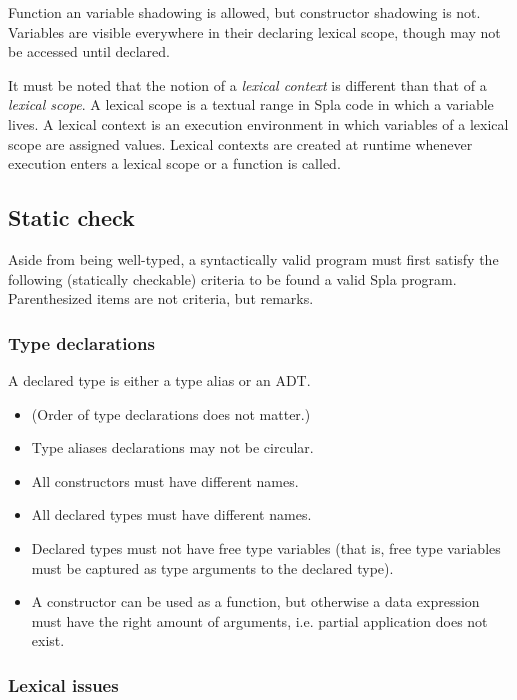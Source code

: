 \documentclass[english,10pt]{article} %
\theoremstyle{definitionstyle}
\theoremstyle{lemmastyle}
\begin{document}
Function an variable shadowing is allowed, but constructor shadowing is not. Variables are visible everywhere in their declaring lexical scope, though may not be accessed until declared.

It must be noted that the notion of a \emph{lexical context} is different than that of a \emph{lexical scope}. A lexical scope is a textual range in Spla code in which a variable lives. A lexical context is an execution environment in which variables of a lexical scope are assigned values. Lexical contexts are created at runtime whenever execution enters a lexical scope or a function is called.


\subsection{Static check}
\label{staticcheck}

Aside from being well-typed, a syntactically valid program must first satisfy the following (statically checkable) criteria to be found a valid Spla program. Parenthesized items are not criteria, but remarks.


\subsubsection*{Type declarations}

A declared type is either a type alias or an ADT.

\begin{itemize}
\item (Order of type declarations does not matter.)
\item Type aliases declarations may not be circular.
\item All constructors must have different names.
\item All declared types must have different names.
\item Declared types must not have free type variables (that is, free type variables must be captured as type arguments to the declared type).
\item A constructor can be used as a function, but otherwise a data expression must have the right amount of arguments, i.e. partial application does not exist.
\end{itemize}


\subsubsection*{Lexical issues}
\end{document}
